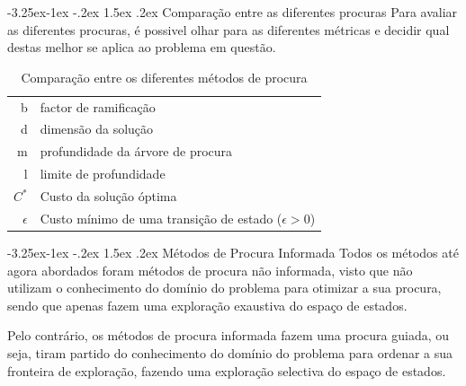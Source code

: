 \documentclass[a4paper,12pt]{article}
\makeatletter
\renewcommand\paragraph{\@startsection{paragraph}{4}{\z@}%
                {-3.25ex\@plus -1ex \@minus -.2ex}%
                {1.5ex \@plus .2ex}%
                {\normalfont\normalsize\bfseries}}
\renewcommand\subparagraph{\@startsection{subparagraph}{5}{\z@}%
                {-3.25ex\@plus -1ex \@minus -.2ex}%
                {1.5ex \@plus .2ex}%
                {\normalfont\normalsize\bfseries}}
\makeatother
\begin{document}
\subparagraph{Comparação entre as diferentes procuras}
Para avaliar as diferentes procuras, é possivel olhar para as diferentes métricas e decidir qual destas melhor se aplica ao problema em questão.

\begin{table}[ht]
\begin{tabular}[h]{r | l}
    b & factor de ramificação\\
    d & dimensão da solução\\
    m & profundidade da árvore de procura\\
    l & limite de profundidade \\
    \(C^{*}\) & Custo da solução óptima \\
    \(\epsilon\) & Custo mínimo de uma transição de estado (\(\epsilon > 0\))
\end{tabular}
\caption{Comparação entre os diferentes métodos de procura} 
\end{table} 

\paragraph{Métodos de Procura Informada}
Todos os métodos até agora abordados foram métodos de procura não informada, visto que não utilizam o conhecimento do domínio do problema para otimizar a sua procura, sendo que apenas fazem uma exploração exaustiva do espaço de estados.

Pelo contrário, os métodos de procura informada fazem uma procura guiada, ou seja, tiram partido do conhecimento do domínio do problema para ordenar a sua fronteira de exploração, fazendo uma exploração selectiva do espaço de estados.
\end{document}
